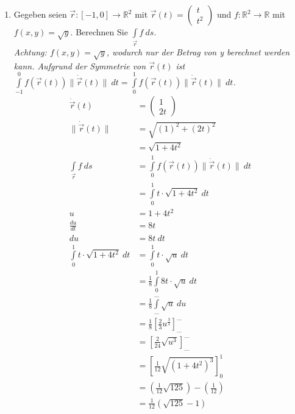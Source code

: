 \documentclass[12pt]{article}
\begin{document}
\begin{enumerate}[start=1,label={\bfseries Frage \arabic*:},leftmargin=1in]
    \enlargethispage{-\baselineskip}
    \enlargethispage{-\baselineskip}
    \enlargethispage{-\baselineskip}

    \item Gegeben seien $\Vec{r}:[-1,0] \to \mathbb{R}^2$ mit $\Vec{r}(t) = \begin{pmatrix} t \\ t^2 \end{pmatrix}$ und $f:\mathbb{R}^2 \to \mathbb{R}$ mit $f(x,y)=\sqrt{y}$. Berechnen Sie $\int\limits_{\Vec{r}} f \: ds$. \\
    \textit{Achtung: $f(x,y)=\sqrt{y}$, wodurch nur der Betrag von y berechnet werden kann. Aufgrund der Symmetrie von $\Vec{r}(t)$ ist $\int\limits_{-1}^{0} f(\Vec{r}(t)) \lVert \Dot{\Vec{r}}(t) \rVert \: dt = \int\limits_{0}^{1} f(\Vec{r}(t)) \lVert \Dot{\Vec{r}}(t) \rVert \: dt$.}
    \begin{align*}
        \Dot{\Vec{r}}(t) &= \begin{pmatrix} 1 \\ 2t \end{pmatrix} \\
        \lVert \Dot{\Vec{r}}(t) \rVert &= \sqrt{(1)^2 + (2t)^2} \\
        &= \sqrt{1 + 4t^2} \\
        \int\limits_{\Vec{r}} f \: ds &= \int\limits_{0}^{1} f(\Vec{r}(t)) \lVert \Dot{\Vec{r}}(t) \rVert \: dt \\
        &= \int\limits_{0}^{1} t \cdot \sqrt{1 + 4t^2} \: dt \\
        u &= 1 + 4t^2 \\
        \frac{du}{dt} &= 8t \\
        du &= 8t \: dt \\
        \int\limits_{0}^{1} t \cdot \sqrt{1 + 4t^2} \: dt &= \int\limits_{0}^{1} t \cdot \sqrt{u} \: dt \\
        &= \frac{1}{8} \int\limits_{0}^{1} 8t \cdot \sqrt{u} \: dt \\
        &= \frac{1}{8} \int\limits_{...}^{...} \sqrt{u} \: du \\
        &= \frac{1}{8} \left[\frac{2}{3} u^{\frac{3}{2}}\right]_{...}^{...} \\
        &= \left[\frac{2}{24} \sqrt{u^3}\right]_{...}^{...} \\
        &= \left[\frac{1}{12} \sqrt{(1+4t^2)^3}\right]_{0}^{1} \\
        &= \left(\frac{1}{12}\sqrt{125}\right) - \left(\frac{1}{12}\right) \\
        &= \frac{1}{12} \left(\sqrt{125} - 1 \right)
    \end{align*}


\end{enumerate}
\end{document}
